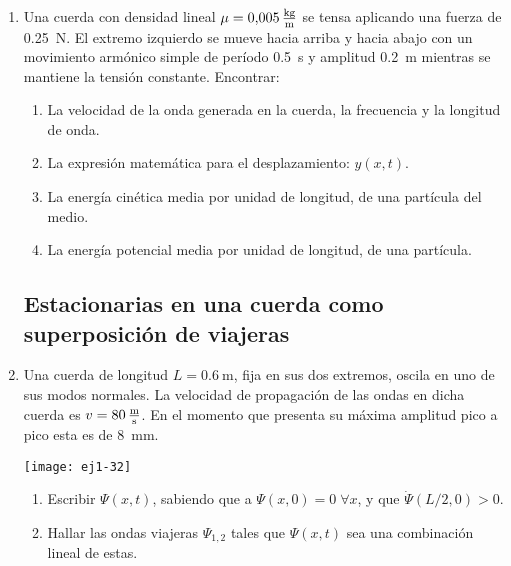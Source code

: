 \documentclass[11pt,spanish,a4paper]{article}
\begin{document}
\begin{enumerate}
\item Una cuerda con densidad lineal $\mu = \SI{0.005}{\kilo\gram\over\metre}$ se tensa aplicando una fuerza de \SI{0.25}{\newton}.
El extremo izquierdo se mueve hacia arriba y hacia abajo con un movimiento armónico simple de período \SI{0.5}{\second} y amplitud \SI{0.2}{\metre} mientras se mantiene la tensión constante.
Encontrar:
\begin{enumerate}
	\item La velocidad de la onda generada en la cuerda, la frecuencia y la longitud de onda.
	\item La expresión matemática para el desplazamiento: $y(x,t)$.
	\item La energía cinética media por unidad de longitud, de una partícula del medio.
	\item La energía potencial media por unidad de longitud, de una partícula.
\end{enumerate}


\subsection*{Estacionarias en una cuerda como superposición de viajeras}

\item 
\begin{minipage}[t][2cm]{0.6\textwidth}
Una cuerda de longitud $L = \SI{0.6}{\metre}$, fija en sus dos extremos, oscila en uno de sus modos normales.
La velocidad de propagación de las ondas en dicha cuerda es \(v = \SI{80}{\metre\over\second}\).
En el momento que presenta su máxima amplitud pico a pico esta es de \SI{8}{\milli\metre}.
\end{minipage}
\begin{minipage}[c][1.5cm][t]{0.34\textwidth}
	\texttt{[image: ej1-32]}
\end{minipage}
\begin{enumerate}
	\item Escribir $\Psi(x,t)$, sabiendo que a $\Psi(x,0) = 0\;\forall x$, y que $\dot{\Psi}(L/2,0) > 0$.
	\item Hallar las ondas viajeras $\Psi_{1,2}$ tales que $\Psi(x,t)$ sea una combinación lineal de estas.
\end{enumerate}



\end{enumerate}
\end{document}
